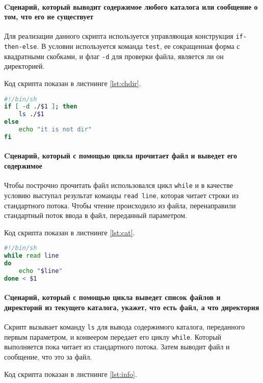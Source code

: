 \paragraph{Cценарий, который выводит содержимое любого каталога
или сообщение о том, что его не существует}\mbox{}\par
Для реализации данного скрипта используется управляющая конструкция
\texttt{if-then-else}. В условии используется команда \texttt{test},
ее сокращенная форма с квадратными скобками, и флаг \texttt{-d}
для проверки файла, является ли он директорией.\par
Код скрипта показан в листнинге \ref{lst:chdir}.

\begin{lstlisting}[language=Bash
	, caption=\leftline{Проверка на директорию}
	, label=lst:chdir]
#!/bin/sh
if [ -d ./$1 ]; then
	ls ./$1
else
	echo "it is not dir"
fi
\end{lstlisting}
\paragraph{Cценарий, который с помощью цикла прочитает файл и
выведет его содержимое}\mbox{}\par
Чтобы построчно прочитать файл использовался цикл \texttt{while} и в качестве
условию выступал результат команды \texttt{read line}, которая читает строки
из стандартного потока. Чтобы чтение происходило из файла, перенаправили
стандартный поток ввода в файл, переданный параметром.\par
Код скрипта показан в листнинге \ref{lst:cat}.

\begin{lstlisting}[language=Bash
	, caption=\leftline{Вывод содержимого файла}
	, label=lst:cat]
#!/bin/sh
while read line
do
	echo "$line"
done < $1
\end{lstlisting}
\paragraph{Cценарий, который с помощью цикла выведет список
файлов и директорий из текущего каталога, укажет, что есть файл, а
что директория}\mbox{}\par
Скрипт вызывает команду \texttt{ls} для вывода содержимого каталога,
переданного первым параметром, и конвеером передает его циклу
\texttt{while}. Который выполняется пока читает из стандартного потока.
Затем выводит файл и сообщение, что это за файл.\par
Код скрипта показан в листнинге \ref{lst:info}.

